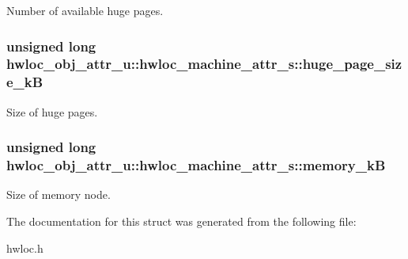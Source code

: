 Number of available huge pages. 

\hypertarget{structhwloc__obj__attr__u_1_1hwloc__machine__attr__s_f9d440e06744c23670a7b2e3a060abb9}{
\subsubsection[{huge\_\-page\_\-size\_\-kB}]{\setlength{\rightskip}{0pt plus 5cm}unsigned long {\bf hwloc\_\-obj\_\-attr\_\-u::hwloc\_\-machine\_\-attr\_\-s::huge\_\-page\_\-size\_\-kB}}}
\label{structhwloc__obj__attr__u_1_1hwloc__machine__attr__s_f9d440e06744c23670a7b2e3a060abb9}


Size of huge pages. 

\hypertarget{structhwloc__obj__attr__u_1_1hwloc__machine__attr__s_de283aa936a98b982fdd395d59c3ee32}{
\subsubsection[{memory\_\-kB}]{\setlength{\rightskip}{0pt plus 5cm}unsigned long {\bf hwloc\_\-obj\_\-attr\_\-u::hwloc\_\-machine\_\-attr\_\-s::memory\_\-kB}}}
\label{structhwloc__obj__attr__u_1_1hwloc__machine__attr__s_de283aa936a98b982fdd395d59c3ee32}


Size of memory node. 



The documentation for this struct was generated from the following file:\begin{CompactItemize}
\item 
hwloc.h\end{CompactItemize}
